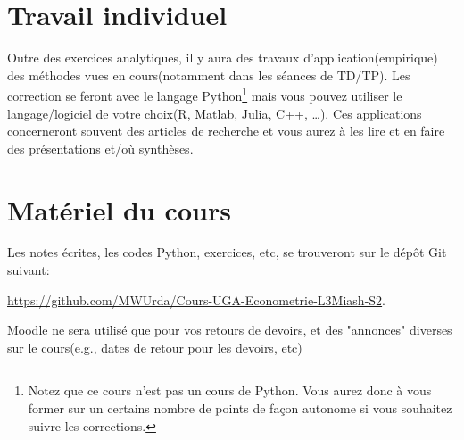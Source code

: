 \section{Travail individuel}
Outre des exercices analytiques, il y aura des travaux d'application(empirique) des méthodes 
vues en cours(notamment dans les séances de TD/TP). Les correction se feront avec le langage 
Python\footnote{Notez que ce cours n'est pas un cours de Python. Vous aurez donc à vous former sur un certains nombre de points 
de façon autonome si vous souhaitez suivre les corrections.} mais vous pouvez utiliser 
le langage/logiciel de votre choix(R, Matlab, Julia, C++, \ldots). Ces applications concerneront souvent 
des articles de recherche et vous aurez à les lire et en faire des présentations et/où synthèses.

\section{Matériel du cours}

Les notes écrites, les codes Python, exercices, etc, se trouveront sur le dépôt Git suivant:

\url{https://github.com/MWUrda/Cours-UGA-Econometrie-L3Miash-S2}.

Moodle ne sera utilisé que pour vos retours de devoirs, et des "annonces" diverses sur le cours(e.g., dates de retour pour les devoirs, etc)


 
